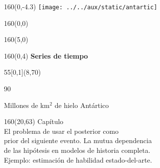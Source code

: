 \documentclass[shownotes,aspectratio=169]{beamer}
\newcounter{capitulo}
\newcommand{\unidad}{\thecapitulo \stepcounter{capitulo}}
\begin{document}
\begin{frame}
\begin{textblock}{160}(0,-4.3) \centering
\texttt{[image: ../../aux/static/antartic]}
\end{textblock}

\begin{textblock}{160}(0,0) \centering
{}
\end{textblock}

\begin{textblock}{160}(5,0)
\end{textblock}


\begin{textblock}{160}(0,4) \centering
\LARGE \hspace{1cm} \textcolor{black!10}{\fontsize{22}{0}\selectfont \textbf{Series de tiempo}}
\end{textblock}


\begin{textblock}{55}[0,1](8,70)
\begin{turn}{90}
\parbox{6cm}{\footnotesize
\textcolor{black!10}{Millones de km$^2$ de hielo Antártico}}
\end{turn}
\end{textblock}


\begin{textblock}{160}(20,63)
\textcolor{black!5}{Capítulo \unidad \\ \small
El problema de usar el posterior como \\
prior del siguiente evento. La mutua dependencia \\
de las hipótesis en modelos de historia completa.  \\
Ejemplo: estimación de habilidad estado-del-arte. \\
}
\end{textblock}


\end{frame}
\end{document}
